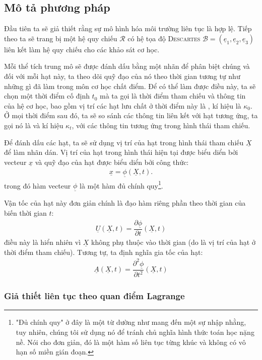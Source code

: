\documentclass[../../../main.tex]{subfiles}
\begin{document}
\subsection{Mô tả phương pháp}
    Đầu tiên ta sẽ giả thiết rằng sự mô hình hóa môi trường liên tục là hợp lệ. Tiếp theo ta sẽ trang bị một hệ quy chiếu $\mathcal{R}$ có hệ tọa độ \textsc{Descartes} $\mathcal{B}=(\underline{e}_1,\underline{e}_2,\underline{e}_3)$ liên kết làm hệ quy chiếu cho các khảo sát cơ học.
    
    Mỗi thể tích trung mô sẽ được đánh dấu bằng một nhãn để phân biệt chúng và đối với mỗi hạt này, ta theo dõi quỹ đạo của nó theo thời gian tương tự như những gì đã làm trong môn cơ học chất điểm. Để có thể làm được điều này, ta sẽ chọn một thời điểm cố định $t_0$ mà ta gọi là thời điểm tham chiếu và thông tin của hệ cơ học, bao gồm vị trí các hạt lưu chất ở thời điểm này là , kí hiệu là $\kappa_0$. Ở mọi thời điểm sau đó, ta sẽ so sánh các thông tin liên kết với hạt tương ứng, ta gọi nó là  và kí hiệu $\kappa_t$, với các thông tin tương ứng trong hình thái tham chiếu.

	Để đánh dấu các hạt, ta sẽ sử dụng vị trí của hạt trong hình thái tham chiếu $\underline{X}$ để làm nhãn dán. Vị trí của hạt trong hình thái hiện tại được biểu diển bởi vecteur $\underline{x}$ và quỹ đạo của hạt được biểu diển bởi công thức:
		\begin{align}\label{eq:Lagrange_trajectoire}
			\underline{x}=\underline{\phi}\left(\underline{X},t\right).
		\end{align}
	trong đó hàm vecteur $\underline{\phi}$ là một hàm đủ chính quy\footnote{"Đủ chính quy" ở đây là một từ dường như mang đến một sự nhập nhằng, tuy nhiên, chúng tôi sử dụng nó để tránh chủ nghĩa hình thức toán học nặng nề. Nói cho đơn giản, đó là một hàm số liên tục  từng khúc và không có vô hạn số miền gián đoạn.}.

	Vận tốc của hạt này đơn giản chính là đạo hàm riêng phần theo thời gian của biến thời gian $t$:
		\begin{align}
			\underline{U}\left(\underline{X},t\right)=\dfrac{\partial\underline{\phi}}{\partial t}\left(\underline{X},t\right)
		\end{align}
	điều này là hiển nhiên vì $\underline{X}$ không phụ thuộc vào thời gian (do là vị trí của hạt ở thời điểm tham chiếu). Tương tự, ta định nghĩa gia tốc của hạt:
		\begin{align}
			\underline{A}\left(\underline{X},t\right)=\dfrac{\partial^2\underline{\phi}}{\partial t^2}\left(\underline{X},t\right)
		\end{align}
	\subsubsection{Giả thiết liên tục theo quan điểm Lagrange}
\end{document}
